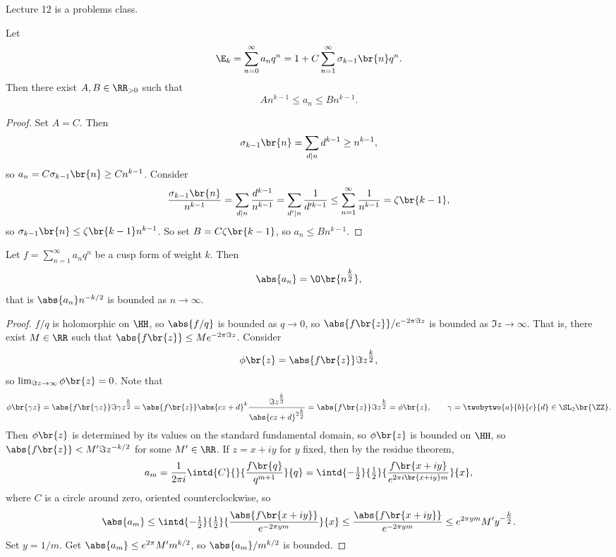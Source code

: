Lecture 12 is a problems class.


\begin{proposition}
Let
$$ \E_k = \sum_{n = 0}^\infty a_nq^n = 1 + C\sum_{n = 1}^\infty \sigma_{k - 1}\br{n}q^n. $$
Then there exist $ A, B \in \RR_{> 0} $ such that
$$ An^{k - 1} \le a_n \le Bn^{k - 1}. $$
\end{proposition}

\begin{proof}
Set $ A = C $. Then
$$ \sigma_{k - 1}\br{n} = \sum_{d \mid n} d^{k - 1} \ge n^{k - 1}, $$
so $ a_n = C\sigma_{k - 1}\br{n} \ge Cn^{k - 1} $. Consider
$$ \dfrac{\sigma_{k - 1}\br{n}}{n^{k - 1}} = \sum_{d \mid n} \dfrac{d^{k - 1}}{n^{k - 1}} = \sum_{d' \mid n} \dfrac{1}{d'^{k - 1}} \le \sum_{n = 1}^\infty \dfrac{1}{n^{k - 1}} = \zeta\br{k - 1}, $$
so $ \sigma_{k - 1}\br{n} \le \zeta\br{k - 1}n^{k - 1} $. So set $ B = C\zeta\br{k - 1} $, so $ a_n \le Bn^{k - 1} $.
\end{proof}

\begin{theorem}[Hecke]
Let $ f = \sum_{n = 1}^\infty a_nq^n $ be a cusp form of weight $ k $. Then
$$ \abs{a_n} = \O\br{n^{\tfrac{k}{2}}}, $$
that is $ \abs{a_n}n^{-k / 2} $ is bounded as $ n \to \infty $.
\end{theorem}

\pagebreak

\begin{proof}
$ f / q $ is holomorphic on $ \HH $, so $ \abs{f / q} $ is bounded as $ q \to 0 $, so $ \abs{f\br{z}} / e^{-2\pi \Im z} $ is bounded as $ \Im z \to \infty $. That is, there exist $ M \in \RR $ such that $ \abs{f\br{z}} \le Me^{-2\pi \Im z} $. Consider
$$ \phi\br{z} = \abs{f\br{z}}\Im z^{\tfrac{k}{2}}, $$
so $ \lim_{\Im z \to \infty} \phi\br{z} = 0 $. Note that
$$ \phi\br{\gamma z} = \abs{f\br{\gamma z}}\Im \gamma z^{\tfrac{k}{2}} = \abs{f\br{z}}\abs{cz + d}^k\dfrac{\Im z^{\tfrac{k}{2}}}{\abs{cz + d}^{2\tfrac{k}{2}}} = \abs{f\br{z}}\Im z^{\tfrac{k}{2}} = \phi\br{z}, \qquad \gamma = \twobytwo{a}{b}{c}{d} \in \SL_2\br{\ZZ}. $$
Then $ \phi\br{z} $ is determined by its values on the standard fundamental domain, so $ \phi\br{z} $ is bounded on $ \HH $, so $ \abs{f\br{z}} < M'\Im z^{-k / 2} $ for some $ M' \in \RR $. If $ z = x + iy $ for $ y $ fixed, then by the residue theorem,
$$ a_m = \dfrac{1}{2\pi i}\intd{C}{}{\dfrac{f\br{q}}{q^{m + 1}}}{q} = \intd{-\tfrac{1}{2}}{\tfrac{1}{2}}{\dfrac{f\br{x + iy}}{e^{2\pi i\br{x + iy}m}}}{x}, $$
where $ C $ is a circle around zero, oriented counterclockwise, so
$$ \abs{a_m} \le \intd{-\tfrac{1}{2}}{\tfrac{1}{2}}{\dfrac{\abs{f\br{x + iy}}}{e^{-2\pi ym}}}{x} \le \dfrac{\abs{f\br{x + iy}}}{e^{-2\pi ym}} \le e^{2\pi ym}M'y^{-\tfrac{k}{2}}. $$
Set $ y = 1 / m $. Get $ \abs{a_m} \le e^{2\pi}M'm^{k / 2} $, so $ \abs{a_m} / m^{k / 2} $ is bounded.
\end{proof}

